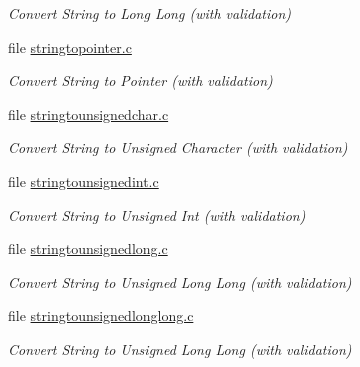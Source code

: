 \begin{DoxyCompactItemize}
\begin{DoxyCompactList}\small\item\em Convert String to Long Long (with validation) \end{DoxyCompactList}\item 
file \mbox{\hyperlink{stringtopointer_8c}{stringtopointer.\+c}}
\begin{DoxyCompactList}\small\item\em Convert String to Pointer (with validation) \end{DoxyCompactList}\item 
file \mbox{\hyperlink{stringtounsignedchar_8c}{stringtounsignedchar.\+c}}
\begin{DoxyCompactList}\small\item\em Convert String to Unsigned Character (with validation) \end{DoxyCompactList}\item 
file \mbox{\hyperlink{stringtounsignedint_8c}{stringtounsignedint.\+c}}
\begin{DoxyCompactList}\small\item\em Convert String to Unsigned Int (with validation) \end{DoxyCompactList}\item 
file \mbox{\hyperlink{stringtounsignedlong_8c}{stringtounsignedlong.\+c}}
\begin{DoxyCompactList}\small\item\em Convert String to Unsigned Long Long (with validation) \end{DoxyCompactList}\item 
file \mbox{\hyperlink{stringtounsignedlonglong_8c}{stringtounsignedlonglong.\+c}}
\begin{DoxyCompactList}\small\item\em Convert String to Unsigned Long Long (with validation) \end{DoxyCompactList}\end{DoxyCompactItemize}
